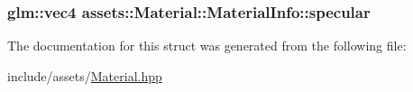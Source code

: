 \hypertarget{structassets_1_1Material_1_1MaterialInfo_af3226e0ef1e991c434bba8c6ecf1c54b}{
\subsubsection[{specular}]{\setlength{\rightskip}{0pt plus 5cm}glm\-::vec4 assets\-::\-Material\-::\-Material\-Info\-::specular}}\label{structassets_1_1Material_1_1MaterialInfo_af3226e0ef1e991c434bba8c6ecf1c54b}


The documentation for this struct was generated from the following file\-:\begin{DoxyCompactItemize}
\item 
include/assets/\hyperlink{Material_8hpp}{Material.\-hpp}\end{DoxyCompactItemize}
